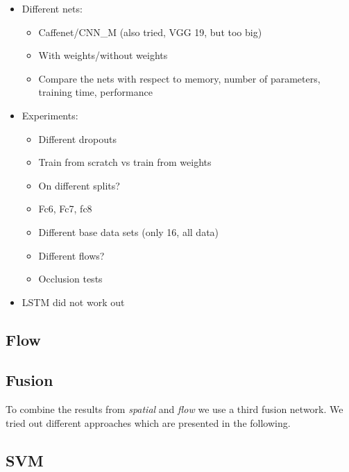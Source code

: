 \begin{itemize}
	\item
		Different nets:
		\begin{itemize}
			\item Caffenet/CNN\_M (also tried, VGG 19, but too big)
			\item With weights/without weights
			\item Compare the nets with respect to memory, number of parameters, training time, performance
		\end{itemize}
	\item
		Experiments:
		\begin{itemize}
			\item Different dropouts
			\item Train from scratch vs train from weights
			\item On different splits?
			\item Fc6, Fc7, fc8
			\item Different base data sets (only 16, all data)
			\item Different flows?
			\item Occlusion tests
		\end{itemize}
	\item
		LSTM did not work out
\end{itemize}


\subsection{Flow}
\label{subsec:flow}



\subsection{Fusion}
\label{subsec:fusion}

To combine the results from \emph{spatial} and \emph{flow} we use a third fusion network.
We tried out different approaches which are presented in the following.

\subsection{SVM}

